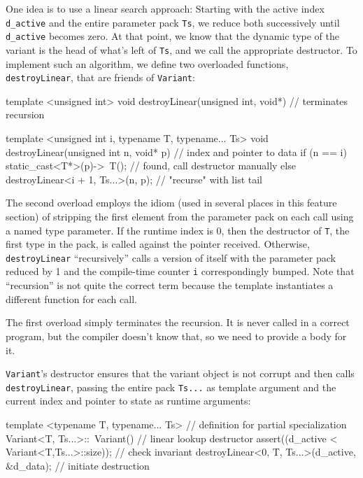 One idea is to use a linear search approach: Starting with the active
index \lstinline!d_active! and the entire parameter pack \lstinline!Ts!, we
reduce both successively until \lstinline!d_active! becomes zero. At that
point, we know that the dynamic type of the variant is the head of
what's left of \lstinline!Ts!, and we call the appropriate destructor. To
implement such an algorithm, we define two overloaded functions,
\lstinline!destroyLinear!, that are friends of \lstinline!Variant!:

\begin{emcppslisting}[emcppsbatch={e38,e39}]
template <unsigned int>
void destroyLinear(unsigned int, void*)      // terminates recursion
{ }

template <unsigned int i, typename T, typename... Ts>
void destroyLinear(unsigned int n, void* p)  // index and pointer to data
{
    if (n == i)
        static_cast<T*>(p)->~T();            // found, call destructor manually
    else
        destroyLinear<i + 1, Ts...>(n, p);   // "recurse" with list tail
}
\end{emcppslisting}
    

\noindent The second overload employs the idiom (used in several places in this
feature section) of stripping the first element from the parameter pack
on each call using a named type parameter. If the runtime index is 0,
then the destructor of \lstinline!T!, the first type in the pack, is called
against the pointer received. Otherwise, \lstinline!destroyLinear!
``recursively'' calls a version of itself with the parameter pack
reduced by 1 and the compile-time counter \lstinline!i! correspondingly
bumped. Note that ``recursion'' is not quite the correct term because
the template instantiates a different function for each call.

The first overload simply terminates the recursion. It is never called
in a correct program, but the compiler doesn't know that, so we need to
provide a body for it.

\lstinline!Variant!'s destructor ensures that the variant object is not
corrupt and then calls\linebreak%
\lstinline!destroyLinear!, passing the entire pack
\lstinline!Ts...! as template argument and the current index and pointer to
state as runtime arguments:

\begin{emcppslisting}[emcppsbatch=e38]
template <typename T, typename... Ts>  // definition for partial specialization
Variant<T, Ts...>::~Variant()          // linear lookup destructor
{
    assert((d_active < Variant<T,Ts...>::size));    // check invariant
    destroyLinear<0, T, Ts...>(d_active, &d_data);  // initiate destruction
}
\end{emcppslisting}
    

